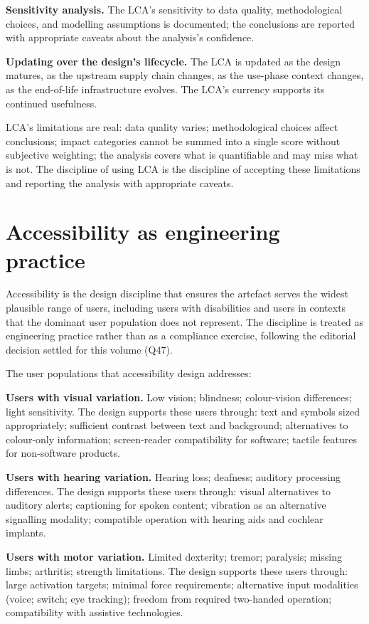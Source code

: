 \textbf{Sensitivity analysis.} The LCA's sensitivity to data quality, methodological choices, and modelling assumptions is documented; the conclusions are reported with appropriate caveats about the analysis's confidence.

\textbf{Updating over the design's lifecycle.} The LCA is updated as the design matures, as the upstream supply chain changes, as the use-phase context changes, as the end-of-life infrastructure evolves. The LCA's currency supports its continued usefulness.

LCA's limitations are real: data quality varies; methodological choices affect conclusions; impact categories cannot be summed into a single score without subjective weighting; the analysis covers what is quantifiable and may miss what is not. The discipline of using LCA is the discipline of accepting these limitations and reporting the analysis with appropriate caveats.

\section{Accessibility as engineering practice}

Accessibility is the design discipline that ensures the artefact serves the widest plausible range of users, including users with disabilities and users in contexts that the dominant user population does not represent. The discipline is treated as engineering practice rather than as a compliance exercise, following the editorial decision settled for this volume (Q47).

The user populations that accessibility design addresses:

\textbf{Users with visual variation.} Low vision; blindness; colour-vision differences; light sensitivity. The design supports these users through: text and symbols sized appropriately; sufficient contrast between text and background; alternatives to colour-only information; screen-reader compatibility for software; tactile features for non-software products.

\textbf{Users with hearing variation.} Hearing loss; deafness; auditory processing differences. The design supports these users through: visual alternatives to auditory alerts; captioning for spoken content; vibration as an alternative signalling modality; compatible operation with hearing aids and cochlear implants.

\textbf{Users with motor variation.} Limited dexterity; tremor; paralysis; missing limbs; arthritis; strength limitations. The design supports these users through: large activation targets; minimal force requirements; alternative input modalities (voice; switch; eye tracking); freedom from required two-handed operation; compatibility with assistive technologies.

